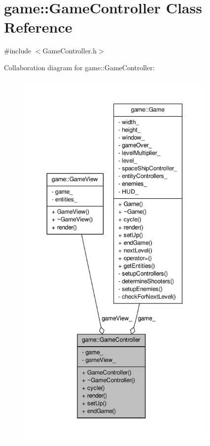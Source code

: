 \hypertarget{classgame_1_1GameController}{\section{game\-:\-:\-Game\-Controller \-Class \-Reference}
\label{d6/d98/classgame_1_1GameController}
}


{\ttfamily \#include $<$\-Game\-Controller.\-h$>$}



\-Collaboration diagram for game\-:\-:\-Game\-Controller\-:\nopagebreak
\begin{figure}[H]
\begin{center}
\leavevmode
\includegraphics[height=550pt]{d9/ddf/classgame_1_1GameController__coll__graph}
\end{center}
\end{figure}
